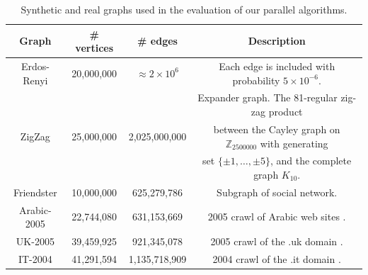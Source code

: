 \documentclass{article} %
\begin{document}

\begin{table}[h]
\centering\footnotesize
\begin{tabular}{|c|c|c|c|}\hline
Graph & \# vertices & \# edges & Description \\\hline\hline
Erdos-Renyi & 20,000,000 & $\approx 2 \times 10^6$ & Each edge is included with probability $5\times 10^{-6}$.\\\hline
\multirow{3}{*}{ZigZag}      & \multirow{3}{*}{25,000,000} &  \multirow{3}{*}{2,025,000,000} & Expander graph. The 81-regular zig-zag product \\
& & & between the Cayley graph on $\mathbb{Z}_{2500000}$ with generating \\
& & & set $\{\pm 1,\dots,\pm 5\}$, and the complete graph $K_{10}$.\\\hline
Friendster  & 10,000,000 &    625,279,786 & Subgraph of social network. \cite{snap}\\\hline
Arabic-2005 & 22,744,080 &    631,153,669 & 2005 crawl of Arabic web sites \cite{BoVWFI, BRSLLP, BCSU3}. \\\hline
UK-2005     & 39,459,925 &    921,345,078 & 2005 crawl of the .uk domain \cite{BoVWFI, BRSLLP, BCSU3}. \\\hline
IT-2004     & 41,291,594 &  1,135,718,909 & 2004 crawl of the .it domain \cite{BoVWFI, BRSLLP, BCSU3}. \\\hline
\end{tabular}
\caption{\footnotesize Synthetic and real graphs used in the evaluation of our parallel algorithms.}
\label{tab:graphstats}
\end{table}
\end{document}
